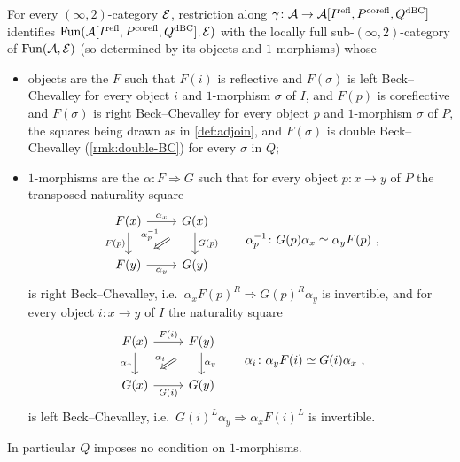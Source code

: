 \begin{prop}
\label{prop:adjoin-univ}
%
For every $(\infty,2)$-category $\mathcal{E}$, restriction along
$\gamma\colon \mathcal{A} \to \mathcal{A}[{I}^{\mathrm{refl}},{P}^{\mathrm{corefl}},{Q}^{\mathrm{dBC}}]$
identifies
$\operatorname{Fun}(\mathcal{A}[{I}^{\mathrm{refl}},{P}^{\mathrm{corefl}},{Q}^{\mathrm{dBC}}],\mathcal{E})$
with the locally full sub-$(\infty,2)$-category of $\operatorname{Fun}(\mathcal{A},\mathcal{E})$ (so determined
by its objects and $1$-morphisms) whose
\begin{itemize}
\item objects are the $F$ such that $F(i)$ is reflective and $F(\sigma)$ is left
Beck--Chevalley for every object $i$ and $1$-morphism $\sigma$ of $I$,
and $F(p)$ is coreflective and $F(\sigma)$ is right Beck--Chevalley for every
object $p$ and $1$-morphism $\sigma$ of $P$,
the squares being drawn as in \cref{def:adjoin},
and $F(\sigma)$ is double Beck--Chevalley (\cref{rmk:double-BC}) for every
$\sigma$ in $Q$;
\item $1$-morphisms are the
$\alpha\colon F \Rightarrow G$
such that for every object $p\colon x \to y$ of $P$ the transposed naturality
square
\begin{equation*}
\begin{tikzcd}
F(x) \ar[r, "\alpha_{x}"] \ar[d, "F(p)"'] & G(x) \ar[d, "G(p)"] \ar[dl,
Rightarrow, shorten=3mm, "\alpha_{p}^{-1}"'] \\
F(y) \ar[r, "\alpha_{y}"'] & G(y)
\end{tikzcd}
\qquad \alpha_{p}^{-1}\colon G(p)\alpha_{x} \simeq \alpha_{y}F(p) \ ,
\end{equation*}
is right Beck--Chevalley, i.e.\
$\alpha_{x}F(p)^{R} \Rightarrow G(p)^{R}\alpha_{y}$
is invertible, and for every object $i\colon x \to y$ of $I$ the naturality
square
\begin{equation*}
\begin{tikzcd}
F(x) \ar[r, "F(i)"] \ar[d, "\alpha_{x}"'] & F(y) \ar[d, "\alpha_{y}"] \ar[dl,
Rightarrow, shorten=3mm, "\alpha_{i}"'] \\
G(x) \ar[r, "G(i)"'] & G(y)
\end{tikzcd}
\qquad \alpha_{i}\colon \alpha_{y}F(i) \simeq G(i)\alpha_{x} \ ,
\end{equation*}
is left Beck--Chevalley, i.e.\
$G(i)^{L}\alpha_{y} \Rightarrow \alpha_{x}F(i)^{L}$
is invertible.
\end{itemize}
In particular $Q$ imposes no condition on $1$-morphisms.
\end{prop}

